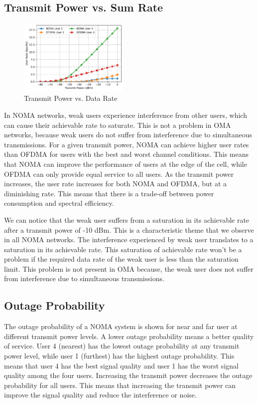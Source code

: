 \documentclass[conference]{IEEEtran}
\begin{document}
\subsection{Transmit Power vs. Sum Rate}

\begin{figure}[t!]
    \centering
    \includegraphics[width=0.47\textwidth, height= 0.35\textwidth]{figures/individual_user_rates.pdf}
    \caption{Transmit Power vs. Data Rate}
\end{figure}

In NOMA networks, weak users experience interference from other users, which can cause their achievable rate to saturate. This is not a problem in OMA networks, because weak users do not suffer from interference due to simultaneous transmissions. For a given transmit power, NOMA can achieve higher user rates than OFDMA for users with the best and worst channel conditions. This means that NOMA can improve the performance of users at the edge of the cell, while OFDMA can only provide equal service to all users. As the transmit power increases, the user rate increases for both NOMA and OFDMA, but at a diminishing rate. This means that there is a trade-off between power consumption and spectral efficiency.

We can notice that the weak user suffers from a saturation in its achievable rate after a transmit power of -10 dBm. This is a characteristic theme that we observe in all NOMA networks. The interference experienced by weak user translates to a saturation in its achievable rate. This saturation of achievable rate won't be a problem if the required data rate of the weak user is less than the saturation limit. This problem is not present in OMA because, the weak user does not suffer from interference due to simultaneous transmissions.

\subsection{Outage Probability}
The outage probability of a NOMA system is shown for near and far user at different transmit power levels. A lower outage probability means a better quality of service. User 4 (nearest) has the lowest outage probability at any transmit power level, while user 1 (furthest) has the highest outage probability. This means that user 4 has the best signal quality and user 1 has the worst signal quality among the four users. Increasing the transmit power decreases the outage probability for all users. This means that increasing the transmit power can improve the signal quality and reduce the interference or noise.
\end{document}
